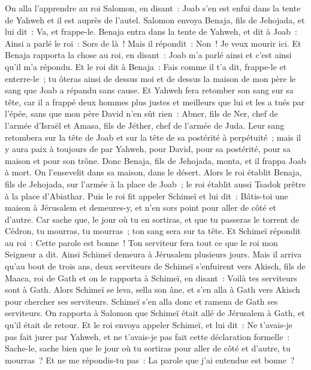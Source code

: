 \begin{multicols}{2}
On alla l'apprendre au roi Salomon, en disant~: Joab s'en est enfui dans la tente de Yahweh et il est auprès de l'autel. Salomon envoya Benaja, fils de Jehojada, et lui dit~: Va, et frappe-le.
Benaja entra dans la tente de Yahweh, et dit à Joab~: Ainsi a parlé le roi~: Sors de là~! Mais il répondit~: Non~! Je veux mourir ici. Et Benaja rapporta la chose au roi, en disant~: Joab m'a parlé ainsi et c'est ainsi qu'il m'a répondu.
Et le roi dit à Benaja~: Fais comme il t'a dit, frappe-le et enterre-le~; tu ôteras ainsi de dessus moi et de dessus la maison de mon père le sang que Joab a répandu sans cause.
Et Yahweh fera retomber son sang sur sa tête, car il a frappé deux hommes plus justes et meilleurs que lui et les a tués par l'épée, sans que mon père David n'en sût rien~: Abner, fils de Ner, chef de l'armée d'Israël et Amasa, fils de Jéther, chef de l'armée de Juda.
Leur sang retombera sur la tête de Joab et sur la tête de sa postérité à perpétuité~; mais il y aura paix à toujours de par Yahweh, pour David, pour sa postérité, pour sa maison et pour son trône.
Donc Benaja, fils de Jehojada, monta, et il frappa Joab à mort. On l'ensevelit dans sa maison, dans le désert.
Alors le roi établit Benaja, fils de Jehojada, sur l'armée à la place de Joab~; le roi établit aussi Tsadok prêtre à la place d'Abiathar.
Puis le roi fit appeler Schimeï et lui dit~: Bâtis-toi une maison à Jérusalem et demeures-y, et n'en sors point pour aller de côté et d'autre.
Car sache que, le jour où tu en sortiras, et que tu passeras le torrent de Cédron, tu mourras, tu mourras~; ton sang sera sur ta tête.
Et Schimeï répondit au roi~: Cette parole est bonne~! Ton serviteur fera tout ce que le roi mon Seigneur a dit. Ainsi Schimeï demeura à Jérusalem plusieurs jours.
Mais il arriva qu'au bout de trois ans, deux serviteurs de Schimeï s'enfuirent vers Akisch, fils de Maaca, roi de Gath et on le rapporta à Schimeï, en disant~: Voilà tes serviteurs sont à Gath.
Alors Schimeï se leva, sella son âne, et s'en alla à Gath vers Akisch pour chercher ses serviteurs. Schimeï s'en alla donc et ramena de Gath ses serviteurs.
On rapporta à Salomon que Schimeï était allé de Jérusalem à Gath, et qu'il était de retour.
Et le roi envoya appeler Schimeï, et lui dit~: Ne t'avais-je pas fait jurer par Yahweh, et ne t'avais-je pas fait cette déclaration formelle~: Sache-le, sache bien que le jour où tu sortiras pour aller de côté et d'autre, tu mourras~? Et ne me répondis-tu pas~: La parole que j'ai entendue est bonne~?

\end{multicols}
